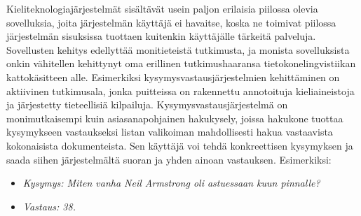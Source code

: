 \begin{multicols}{2}
Kieliteknologiajärjestelmät sisältävät usein paljon erilaisia piilossa olevia sovelluksia, 
joita järjestelmän käyttäjä ei havaitse, koska ne toimivat piilossa järjestelmän
sisuksissa tuottaen kuitenkin käyttäjälle tärkeitä palveluja. Sovellusten kehitys 
edellyttää monitieteistä tutkimusta, ja monista sovelluksista onkin vähitellen
kehittynyt oma erillinen tutkimushaaransa tietokonelingvistiikan kattokäsitteen alle.
Esimerkiksi kysymysvastausjärjestelmien kehittäminen on aktiivinen tutkimusala,
jonka puitteissa on rakennettu annotoituja kieliaineistoja ja
järjestetty tieteellisiä kilpailuja. Kysymysvastausjärjestelmä on monimutkaisempi 
kuin asiasanapohjainen hakukysely, joissa hakukone tuottaa kysymykseen vastaukseksi
listan valikoiman mahdollisesti hakua vastaavista kokonaisista dokumenteista. Sen käyttäjä 
voi tehdä konkreettisen kysymyksen ja saada siihen järjestelmältä suoran ja yhden ainoan 
vastauksen. Esimerkiksi:
\begin{itemize}
\item[] \textit{Kysymys: Miten vanha Neil Armstrong oli astuessaan
 kuun pinnalle?}

\item[] \textit{Vastaus: 38.}
\end{itemize}


\end{multicols}
